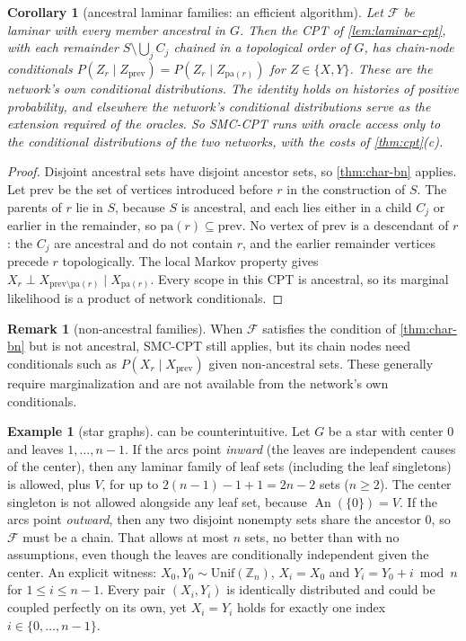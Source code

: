 \documentclass[11pt]{article}
\newtheorem{corollary}[theorem]{Corollary}
\theoremstyle{definition}
\newtheorem{example}[theorem]{Example}
\newtheorem{remark}[theorem]{Remark}
\newcommand{\An}{\operatorname{An}}
\newcommand{\Var}{V}
\newcommand{\F}{\mathcal{F}}
\begin{document}
\begin{corollary}[ancestral laminar families: an efficient algorithm]\label{cor:ancestral}
Let $\F$ be laminar with every member ancestral in $G$. Then the CPT of
\cref{lem:laminar-cpt}, with each remainder $S\setminus\bigcup_jC_j$ chained in a
topological order of $G$, has chain-node conditionals
$P(Z_r\mid Z_{\mathrm{prev}})=P(Z_r\mid Z_{\mathrm{pa}(r)})$ for $Z\in\{X,Y\}$.
These are the network's own conditional distributions. The identity holds on
histories of positive probability, and elsewhere the network's conditional
distributions serve as the extension required of the oracles. So SMC-CPT runs with
oracle access only to the conditional distributions of the two networks, with
the costs of \cref{thm:cpt}(c).
\end{corollary}
\begin{proof}
Disjoint ancestral sets have disjoint ancestor sets, so \cref{thm:char-bn}
applies. Let $\mathrm{prev}$ be the set of vertices introduced before $r$ in the
construction of $S$. The parents of $r$ lie in $S$, because $S$ is ancestral,
and each lies either in a child $C_j$ or earlier in the remainder, so
$\mathrm{pa}(r)\subseteq\mathrm{prev}$. No vertex of $\mathrm{prev}$ is a
descendant of $r$: the $C_j$ are ancestral and do not contain $r$, and the
earlier remainder vertices precede $r$ topologically. The local Markov property
gives $X_r\perp X_{\mathrm{prev}\setminus\mathrm{pa}(r)}\mid X_{\mathrm{pa}(r)}$.
Every scope in this CPT is ancestral, so its marginal likelihood is a product
of network conditionals.
\end{proof}

\begin{remark}[non-ancestral families]
When $\F$ satisfies the condition of \cref{thm:char-bn} but is not ancestral,
SMC-CPT still applies, but its chain nodes need conditionals such as
$P(X_r\mid X_{\mathrm{prev}})$ given non-ancestral sets. These generally
require marginalization and are not available from the network's own
conditionals.
\end{remark}

\begin{example}[star graphs]\label{ex:star}
 can be counterintuitive. Let $G$ be a star with center $0$
and leaves $1,\dots,n-1$. If the arcs point \emph{inward} (the leaves are
independent causes of the center), then any laminar family of leaf sets
(including the leaf singletons) is allowed, plus $\Var$, for up to
$2(n-1)-1+1=2n-2$ sets ($n\ge2$). The center singleton is not allowed alongside
any leaf set, because $\An(\{0\})=\Var$.
If the arcs point \emph{outward}, then any two disjoint nonempty sets share the
ancestor $0$, so $\F$ must be a chain. That allows at most $n$ sets, no better
than with no assumptions, even though the leaves are conditionally independent
given the center. An explicit witness: $X_0,Y_0\sim\mathrm{Unif}(\mathbb Z_n)$,
$X_i=X_0$ and $Y_i=Y_0+i\bmod n$ for $1\le i\le n-1$. Every pair $(X_i,Y_i)$ is
identically distributed and could be coupled perfectly on its own, yet
$X_i=Y_i$ holds for exactly one index $i\in\{0,\dots,n-1\}$.
\end{example}
\end{document}
